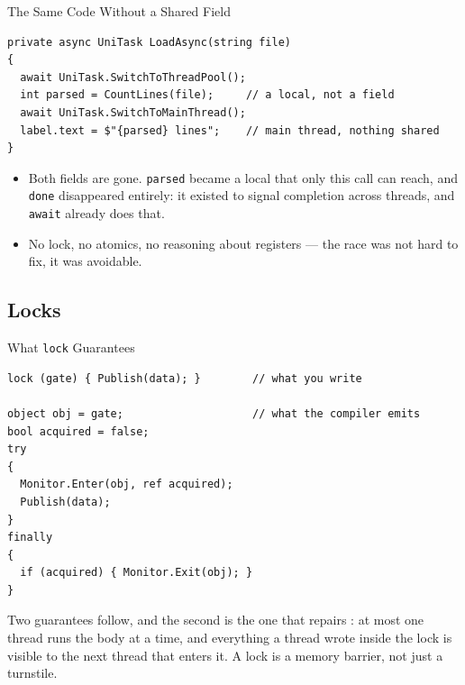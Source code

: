 \begin{frame}[fragile]{The Same Code Without a Shared Field}
  \begin{lstlisting}[basicstyle=\scriptsize\ttfamily]
private async UniTask LoadAsync(string file)
{
  await UniTask.SwitchToThreadPool();
  int parsed = CountLines(file);     // a local, not a field
  await UniTask.SwitchToMainThread();
  label.text = $"{parsed} lines";    // main thread, nothing shared
}
  \end{lstlisting}
  \vspace{1ex}

  \begin{itemize}
    \item Both fields are gone. \texttt{parsed} became a local that only this
      call can reach, and \texttt{done} disappeared entirely: it existed to
      signal completion across threads, and \texttt{await} already does that.
    \item No lock, no atomics, no reasoning about registers --- the race was
      not hard to fix, it was avoidable.
  \end{itemize}
  \vspace{1ex}

\end{frame}

\subsection{Locks}

\begin{frame}[fragile]{What \texttt{lock} Guarantees}
  \begin{lstlisting}[basicstyle=\scriptsize\ttfamily]
lock (gate) { Publish(data); }        // what you write

object obj = gate;                    // what the compiler emits
bool acquired = false;
try
{
  Monitor.Enter(obj, ref acquired);
  Publish(data);
}
finally
{
  if (acquired) { Monitor.Exit(obj); }
}
  \end{lstlisting}
  \vspace{1ex}

  Two guarantees follow, and the second is the one that repairs
  : at most one thread runs the body at a time, and
  everything a thread wrote inside the lock is visible to the next thread
  that enters it. A lock is a memory barrier, not just a turnstile.
\end{frame}

